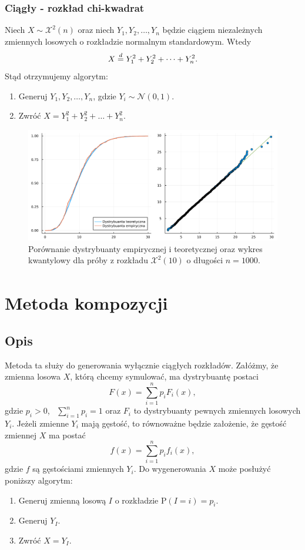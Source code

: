 \documentclass[12pt]{mwrep}
\begin{document}
	\subsubsection{Ciągły - rozkład chi-kwadrat}
	\noindent Niech $ X \sim \mathcal{X}^2(n) $ oraz niech $Y_1, Y_2, \dots, Y_n$ będzie ciągiem niezależnych zmiennych losowych o rozkładzie normalnym standardowym. Wtedy
	$$ X \buildrel{d} \over{=} Y_1^2 + Y_2^2 + \dots + Y_n^2. $$
	Stąd otrzymujemy algorytm:
	\begin{enumerate}[leftmargin=10mm]
		\item Generuj $ Y_1, Y_2, \dots, Y_n $, gdzie $Y_i \sim \mathcal{N}(0, 1) $.
		\item Zwróć $ X = Y_1^2 + Y_2^2 + \dots + Y_n^2 $.
	\end{enumerate}
	\begin{figure}[H]
		\centering
		\caption{Porównanie dystrybuanty empirycznej i teoretycznej oraz wykres kwantylowy dla próby z rozkładu $\mathcal{X}^2(10)$ o długości $n = 1000$.}
		\includegraphics[scale=0.1]{fig/fig_splot2.png}
	\end{figure}
	
	
	
	
	
	\section{Metoda kompozycji\textsuperscript{\cite{kompozycja}}}
	
	\subsection{Opis}
	\noindent Metoda ta służy do generowania wyłącznie ciągłych rozkładów. Załóżmy, że zmienna losowa $X$, którą chcemy symulować, ma dystrybuantę postaci
	$$ F(x) = \sum_{i=1}^n p_i F_i(x), $$
	gdzie $p_i > 0$, \ $\sum\limits_{i=1}^n p_i = 1$ oraz $F_i$ to dystrybuanty pewnych zmiennych losowych $Y_i$. Jeżeli zmienne $Y_i$ mają gęstość, to równoważne będzie założenie, że gęstość zmiennej $X$ ma postać
	$$ f(x) = \sum_{i=1}^n p_i f_i(x), $$
	gdzie $f$ są gęstościami zmiennych $Y_i$. Do wygenerowania $X$ może posłużyć poniższy algorytm:
	\begin{enumerate}[leftmargin=10mm]
		\item Generuj zmienną losową $I$ o rozkładzie $\mathrm{P}(I = i) = p_i$.
		\item Generuj $Y_I$.
		\item Zwróć $X = Y_I$.
	\end{enumerate}
\end{document}

